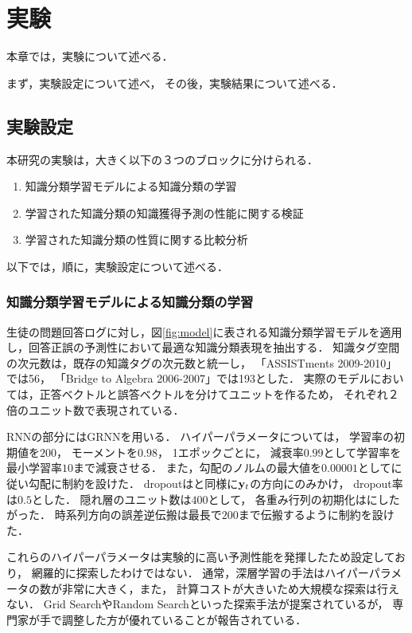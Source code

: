 \chapter{実験}
\label{chap:result}
\fancyhf{}
\rhead{\thepage}
\cfoot{\thepage}


本章では，実験について述べる．

まず，実験設定について述べ，
その後，実験結果について述べる．


\section{実験設定}

本研究の実験は，大きく以下の３つのブロックに分けられる．
\begin{enumerate}
	\item 知識分類学習モデルによる知識分類の学習
	\item 学習された知識分類の知識獲得予測の性能に関する検証
	\item 学習された知識分類の性質に関する比較分析
\end{enumerate}
以下では，順に，実験設定について述べる．


\subsection{知識分類学習モデルによる知識分類の学習}
\label{sec:section}
生徒の問題回答ログに対し，図\ref{fig:model}に表される知識分類学習モデルを適用し，回答正誤の予測性において最適な知識分類表現を抽出する．
知識タグ空間の次元数は，既存の知識タグの次元数と統一し，
「ASSISTments 2009-2010」では56，
「Bridge to Algebra 2006-2007」では193とした．
実際のモデルにおいては，正答ベクトルと誤答ベクトルを分けてユニットを作るため，
それぞれ２倍のユニット数で表現されている．

RNNの部分にはGRNNを用いる．
ハイパーパラメータについては，
学習率の初期値を$200$，
モーメントを$0.98$，
1エポックごとに，
減衰率$0.99$として学習率を最小学習率$10$まで減衰させる．
また，勾配のノルムの最大値を$0.00001$として\cite{pascanu2013difficulty}に従い勾配に制約を設けた．
dropoutは\cite{piech2015deep}と同様に${\bf y}_t$の方向にのみかけ，
dropout率は$0.5$とした．
隠れ層のユニット数は$400$として，
各重み行列の初期化は\cite{glorot2010understanding}にしたがった．
時系列方向の誤差逆伝搬は最長で$200$まで伝搬するように制約を設けた．

これらのハイパーパラメータは実験的に高い予測性能を発揮したため設定しており，
網羅的に探索したわけではない．
通常，深層学習の手法はハイパーパラメータの数が非常に大きく，また，
計算コストが大きいため大規模な探索は行えない．
Grid SearchやRandom Search\cite{bergstra2012random}といった探索手法が提案されているが，
専門家が手で調整した方が優れていることが報告されている\cite{larochelle2007empirical, bergstra2012random}．

